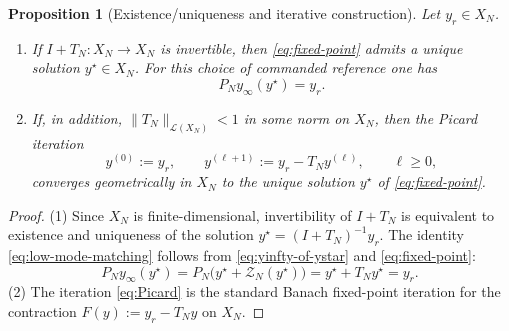 \documentclass[11pt,a4paper]{article}
\numberwithin{equation}{section}
\newtheorem{proposition}[theorem]{Proposition}
\theoremstyle{definition}
\newcommand{\1}{\mathbbm{1}}
\begin{document}
\begin{proposition}[Existence/uniqueness and iterative construction]
\label{prop:fixed-point}
Let $y_r\in X_N$.
\begin{enumerate}
\item If $I+T_N:X_N\to X_N$ is invertible, then \eqref{eq:fixed-point} admits a unique solution
$y^\star\in X_N$. For this choice of commanded reference one has
\begin{equation}
\label{eq:low-mode-matching}
P_N y_\infty(y^\star)=y_r.
\end{equation}
\item If, in addition, $\|T_N\|_{\mathcal{L}(X_N)}<1$ in some norm on $X_N$, then the Picard iteration
\begin{equation}
\label{eq:Picard}
y^{(0)}:=y_r,\qquad y^{(\ell+1)}:=y_r- T_N y^{(\ell)},\qquad \ell\ge 0,
\end{equation}
converges geometrically in $X_N$ to the unique solution $y^\star$ of \eqref{eq:fixed-point}.
\end{enumerate}
\end{proposition}

\begin{proof}
(1) Since $X_N$ is finite-dimensional, invertibility of $I+T_N$ is equivalent to existence and uniqueness of the
solution $y^\star=(I+T_N)^{-1}y_r$. The identity \eqref{eq:low-mode-matching} follows from
\eqref{eq:yinfty-of-ystar} and \eqref{eq:fixed-point}:
\[
P_N y_\infty(y^\star)=P_N\bigl(y^\star+\mathcal{Z}_N(y^\star)\bigr)=y^\star+T_Ny^\star=y_r.
\]
(2) The iteration \eqref{eq:Picard} is the standard Banach fixed-point iteration for the contraction
$F(y):=y_r-T_Ny$ on $X_N$.
\end{proof}
\end{document}
